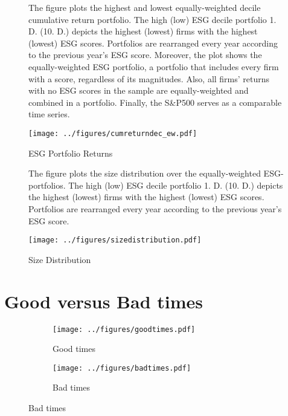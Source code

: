 \documentclass[11pt]{article}
\newcommand\fnote[1]{\captionsetup{font=small}\caption*{#1}}
\begin{document}
\begin{appendices}
\begin{figure}[!htp]
	\centering
	\caption{ESG Portfolio Returns}
	\fnote{The figure plots the highest and lowest equally-weighted decile cumulative return portfolio. The high (low) ESG decile portfolio 1. D. (10. D.) depicts the highest (lowest) firms with the highest (lowest) ESG scores. Portfolios are rearranged every year according to the previous year's ESG score. Moreover, the plot shows the equally-weighted ESG portfolio, a portfolio that includes every firm with a score, regardless of its magnitudes. Also, all firms' returns with no ESG scores in the sample are equally-weighted and combined in a portfolio. Finally, the S\&P500 serves as a comparable time series.}
	\label{fig:esg_returns}
	\texttt{[image: ../figures/cumreturndec\_ew.pdf]}
\end{figure}



\begin{figure}[!htp]
	\centering
	\caption{Size Distribution}
	\fnote{The figure plots the size distribution over the equally-weighted ESG-portfolios. The high (low) ESG decile portfolio 1. D. (10. D.) depicts the highest (lowest) firms with the highest (lowest) ESG scores. Portfolios are rearranged every year according to the previous year's ESG score.}
	\label{fig:sizedistr}
	\texttt{[image: ../figures/sizedistribution.pdf]}
\end{figure}


\clearpage
\section{Good versus Bad times}

\begin{figure}[!htp]
	\centering
	\caption{Good and Bad times}
	\fnote{}
	\label{fig:goodversusbaddummy}
	\begin{subfigure}{0.5\textwidth}
		\centering
		\caption{Good times}
		\label{fig:goodtimesdummy}
		\texttt{[image: ../figures/goodtimes.pdf]}
	\end{subfigure}%
	\begin{subfigure}{0.5\textwidth}
		\centering
		\caption{Bad times}
		\label{fig:badtimesdummy}
		\texttt{[image: ../figures/badtimes.pdf]}
	\end{subfigure}
\end{figure}





\end{appendices}
\end{document}
